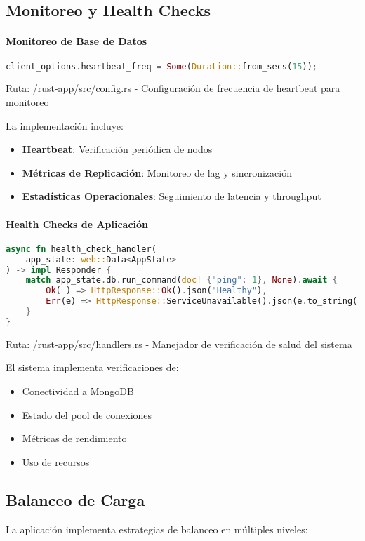\documentclass[12pt,letterpaper]{article}
\begin{document}
\subsection{Monitoreo y Health Checks}
\paragraph{Monitoreo de Base de Datos}
\begin{lstlisting}[language=rust]
client_options.heartbeat_freq = Some(Duration::from_secs(15));
\end{lstlisting}
\small{Ruta: /rust-app/src/config.rs - Configuración de frecuencia de heartbeat para monitoreo}

La implementación incluye:
\begin{itemize}
    \item \textbf{Heartbeat}: Verificación periódica de nodos
    \item \textbf{Métricas de Replicación}: Monitoreo de lag y sincronización
    \item \textbf{Estadísticas Operacionales}: Seguimiento de latencia y throughput
\end{itemize}

\paragraph{Health Checks de Aplicación}
\begin{lstlisting}[language=rust]
async fn health_check_handler(
    app_state: web::Data<AppState>
) -> impl Responder {
    match app_state.db.run_command(doc! {"ping": 1}, None).await {
        Ok(_) => HttpResponse::Ok().json("Healthy"),
        Err(e) => HttpResponse::ServiceUnavailable().json(e.to_string())
    }
}
\end{lstlisting}
\small{Ruta: /rust-app/src/handlers.rs - Manejador de verificación de salud del sistema}

El sistema implementa verificaciones de:
\begin{itemize}
    \item Conectividad a MongoDB
    \item Estado del pool de conexiones
    \item Métricas de rendimiento
    \item Uso de recursos
\end{itemize}

\subsection{Balanceo de Carga}
La aplicación implementa estrategias de balanceo en múltiples niveles:
\end{document}
